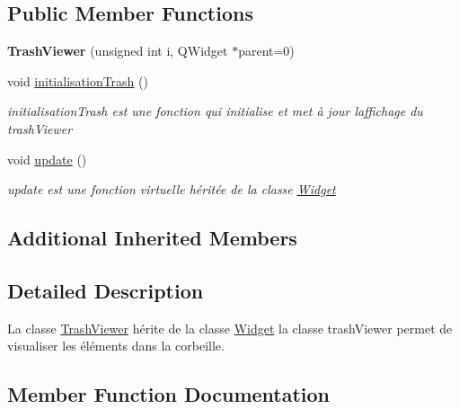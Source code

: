 \subsection*{Public Member Functions}
\begin{DoxyCompactItemize}
\item 
\mbox{\label{classTrashViewer_a47811f379d0de5ab29fa113a9815a39d}} 
{\bfseries Trash\+Viewer} (unsigned int i, Q\+Widget $\ast$parent=0)
\item 
\mbox{\label{classTrashViewer_a84ed16ad2bf205453291f0a9c0699867}} 
void \hyperlink{classTrashViewer_a84ed16ad2bf205453291f0a9c0699867}{initialisation\+Trash} ()
\begin{DoxyCompactList}\small\item\em initialisation\+Trash est une fonction qui initialise et met à jour l\textquotesingle{}affichage du trash\+Viewer \end{DoxyCompactList}\item 
\mbox{\label{classTrashViewer_a841eb043f2ca34b72d9154d0b91bcd48}} 
void \hyperlink{classTrashViewer_a841eb043f2ca34b72d9154d0b91bcd48}{update} ()
\begin{DoxyCompactList}\small\item\em update est une fonction virtuelle héritée de la classe \hyperlink{classWidget}{Widget} \end{DoxyCompactList}\end{DoxyCompactItemize}
\subsection*{Additional Inherited Members}


\subsection{Detailed Description}
La classe \hyperlink{classTrashViewer}{Trash\+Viewer} hérite de la classe \hyperlink{classWidget}{Widget} la classe trash\+Viewer permet de visualiser les éléments dans la corbeille. 

\subsection{Member Function Documentation}
\mbox{\label{classTrashViewer_aa5bef46480167fc713a7f6044c14873f}} 
